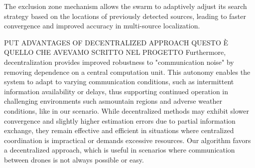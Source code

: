 The exclusion zone mechanism allows the swarm 
to adaptively adjust its search strategy based on the locations 
of previously detected sources, leading to faster convergence 
and improved accuracy in multi-source localization.


PUT ADVANTAGES OF DECENTRALIZED APPROACH
QUESTO È QUELLO CHE AVEVAMO SCRITTO NEL PROGETTO
Furthermore, decentralization provides improved robustness to "communication noise" by removing 
dependence on a central computation unit. This autonomy enables the system to adapt to varying 
communication conditions, such as intermittent information availability or delays, thus supporting 
continued operation in challenging environments such asmountain regions and adverse weather 
conditions, like in our scenario. While decentralized methods may exhibit slower convergence and slightly higher estimation 
errors due to partial information exchange, they remain effective and efficient in situations where 
centralized coordination is impractical or demands excessive resources.
Our algorithm favors a decentralized approach, which is useful 
in scenarios where communication between drones is not always 
possible or easy.